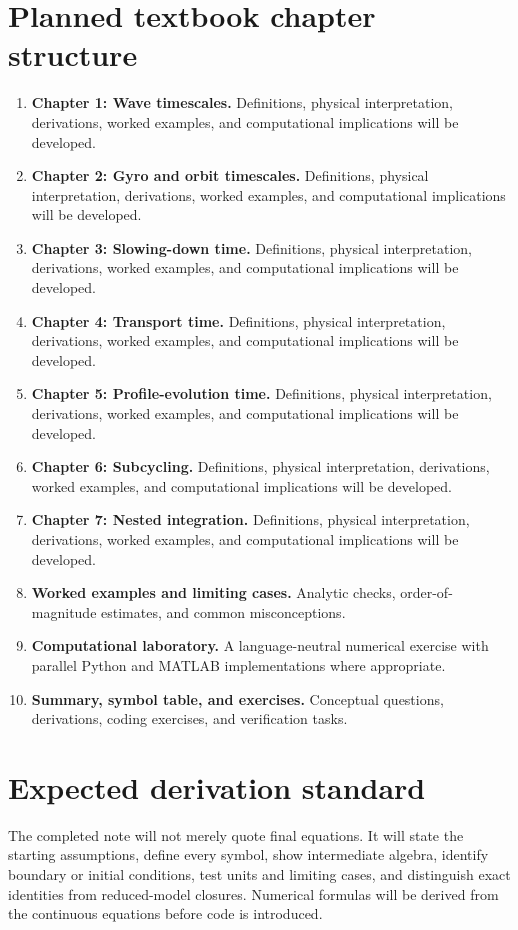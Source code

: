 \documentclass[11pt]{article}
\begin{document}
\section{Planned textbook chapter structure}
\begin{enumerate}[leftmargin=1.8em]
\item \textbf{Chapter 1: Wave timescales.} Definitions, physical interpretation, derivations, worked examples, and computational implications will be developed.
\item \textbf{Chapter 2: Gyro and orbit timescales.} Definitions, physical interpretation, derivations, worked examples, and computational implications will be developed.
\item \textbf{Chapter 3: Slowing-down time.} Definitions, physical interpretation, derivations, worked examples, and computational implications will be developed.
\item \textbf{Chapter 4: Transport time.} Definitions, physical interpretation, derivations, worked examples, and computational implications will be developed.
\item \textbf{Chapter 5: Profile-evolution time.} Definitions, physical interpretation, derivations, worked examples, and computational implications will be developed.
\item \textbf{Chapter 6: Subcycling.} Definitions, physical interpretation, derivations, worked examples, and computational implications will be developed.
\item \textbf{Chapter 7: Nested integration.} Definitions, physical interpretation, derivations, worked examples, and computational implications will be developed.
\item \textbf{Worked examples and limiting cases.} Analytic checks, order-of-magnitude estimates, and common misconceptions.
\item \textbf{Computational laboratory.} A language-neutral numerical exercise with parallel Python and MATLAB implementations where appropriate.
\item \textbf{Summary, symbol table, and exercises.} Conceptual questions, derivations, coding exercises, and verification tasks.
\end{enumerate}

\section{Expected derivation standard}
The completed note will not merely quote final equations. It will state the starting assumptions, define every symbol, show intermediate algebra, identify boundary or initial conditions, test units and limiting cases, and distinguish exact identities from reduced-model closures. Numerical formulas will be derived from the continuous equations before code is introduced.
\end{document}
